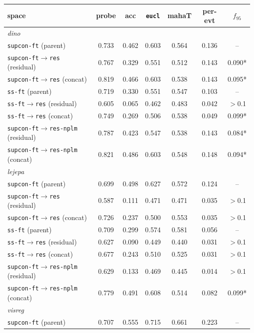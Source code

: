 \documentclass{article}
\begin{document}
\begin{table}[p]\centering\small
\setlength{\tabcolsep}{4pt}
\begin{tabular}{lcccccc}
\toprule
space & probe & acc & \texttt{eucl} & mahaT & per-evt & $f_{95}$ \\
\midrule
\multicolumn{7}{l}{\emph{dino}}\\
\texttt{supcon-ft} (parent) & 0.733 & 0.462 & 0.603 & 0.564 & 0.136 & -- \\
\texttt{supcon-ft$\to$res} (residual) & 0.767 & 0.329 & 0.551 & 0.512 & 0.143 & 0.090* \\
\texttt{supcon-ft$\to$res} (concat) & 0.819 & 0.466 & 0.603 & 0.538 & 0.143 & 0.095* \\
\texttt{ss-ft} (parent) & 0.719 & 0.330 & 0.551 & 0.547 & 0.103 & -- \\
\texttt{ss-ft$\to$res} (residual) & 0.605 & 0.065 & 0.462 & 0.483 & 0.042 & $>$0.1 \\
\texttt{ss-ft$\to$res} (concat) & 0.749 & 0.269 & 0.506 & 0.538 & 0.049 & 0.099* \\
\texttt{supcon-ft$\to$res-nplm} (residual) & 0.787 & 0.423 & 0.547 & 0.538 & 0.143 & 0.084* \\
\texttt{supcon-ft$\to$res-nplm} (concat) & 0.821 & 0.486 & 0.603 & 0.548 & 0.148 & 0.094* \\
\multicolumn{7}{l}{\emph{lejepa}}\\
\texttt{supcon-ft} (parent) & 0.699 & 0.498 & 0.627 & 0.572 & 0.124 & -- \\
\texttt{supcon-ft$\to$res} (residual) & 0.587 & 0.111 & 0.471 & 0.471 & 0.035 & $>$0.1 \\
\texttt{supcon-ft$\to$res} (concat) & 0.726 & 0.237 & 0.500 & 0.553 & 0.035 & $>$0.1 \\
\texttt{ss-ft} (parent) & 0.709 & 0.299 & 0.574 & 0.581 & 0.056 & -- \\
\texttt{ss-ft$\to$res} (residual) & 0.627 & 0.090 & 0.449 & 0.440 & 0.031 & $>$0.1 \\
\texttt{ss-ft$\to$res} (concat) & 0.677 & 0.243 & 0.510 & 0.525 & 0.031 & $>$0.1 \\
\texttt{supcon-ft$\to$res-nplm} (residual) & 0.629 & 0.133 & 0.469 & 0.445 & 0.014 & $>$0.1 \\
\texttt{supcon-ft$\to$res-nplm} (concat) & 0.779 & 0.491 & 0.608 & 0.514 & 0.082 & 0.099* \\
\multicolumn{7}{l}{\emph{visreg}}\\
\texttt{supcon-ft} (parent) & 0.707 & 0.555 & 0.715 & 0.661 & 0.223 & -- \\

\end{tabular}
\end{table}
\end{document}
